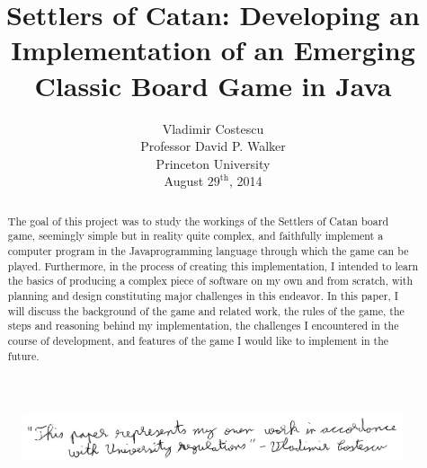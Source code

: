 \documentclass[pageno]{jpaper}
\begin{document}
\lstset{language=Java,basicstyle=\ttfamily}

\title{
Settlers of Catan: Developing an Implementation of an Emerging Classic Board Game in Java}
\date{}

\author{Vladimir Costescu \\ Professor David P. Walker \\ Princeton University \\ August $29^{\text{th}}$, 2014}
\maketitle
\vspace*{\fill}
\begin{figure}
\centering
\includegraphics[width=150mm]{honor_code.png}
\end{figure}
\thispagestyle{empty} %

\newpage
\tableofcontents
\thispagestyle{empty}
\newpage

\begin{abstract}
The goal of this project was to study the workings of the Settlers of Catan\textsuperscript{\textregistered} board game, seemingly simple but in reality quite complex, and faithfully implement a computer program in the Java\texttrademark programming language through which the game can be played. Furthermore, in the process of creating this implementation, I intended to learn the basics of producing a complex piece of software on my own and from scratch, with planning and design constituting major challenges in this endeavor. In this paper, I will discuss the background of the game and related work, the rules of the game, the steps and reasoning behind my implementation, the challenges I encountered in the course of development, and features of the game I would like to implement in the future.
\end{abstract}
\end{document}
